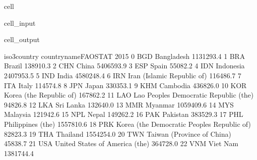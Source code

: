 \documentclass[letterpaper,10pt,english]{jupyterBook}
\begin{document}
\begin{sphinxuseclass}{cell}\begin{sphinxVerbatimInput}

\begin{sphinxuseclass}{cell_input}
\begin{sphinxVerbatim}[commandchars=\\\{\}]
\end{sphinxVerbatim}

\end{sphinxuseclass}\end{sphinxVerbatimInput}
\begin{sphinxVerbatimOutput}

\begin{sphinxuseclass}{cell_output}
\begin{sphinxVerbatim}[commandchars=\\\{\}]
   iso3\PYGZus{}country                         country\PYGZus{}name\PYGZus{}FAOSTAT       2015  \PYGZbs{}
0           BGD                                   Bangladesh  1131293.4   
1           BRA                                       Brazil   138910.3   
2           CHN                                        China  5406593.9   
3           ESP                                        Spain    55082.2   
4           IDN                                    Indonesia  2407953.5   
5           IND                                        India  4580248.4   
6           IRN                   Iran (Islamic Republic of)   116486.7   
7           ITA                                        Italy   114574.8   
8           JPN                                        Japan   330353.1   
9           KHM                                     Cambodia   436826.0   
10          KOR                      Korea (the Republic of)   167862.2   
11          LAO       Lao People\PYGZsq{}s Democratic Republic (the)    94826.8   
12          LKA                                    Sri Lanka   132640.0   
13          MMR                                      Myanmar  1059409.6   
14          MYS                                     Malaysia   121942.6   
15          NPL                                        Nepal   149262.2   
16          PAK                                     Pakistan   383529.3   
17          PHL                            Philippines (the)  1557810.6   
18          PRK  Korea (the Democratic People\PYGZsq{}s Republic of)    82823.3   
19          THA                                     Thailand  1554254.0   
20          TWN                   Taiwan (Province of China)    45838.7   
21          USA               United States of America (the)   364728.0   
22          VNM                                     Viet Nam  1381744.4   


\end{sphinxVerbatim}
\end{sphinxuseclass}
\end{sphinxVerbatimOutput}
\end{sphinxuseclass}
\end{document}
